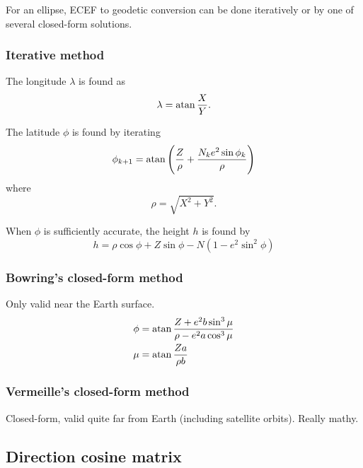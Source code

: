 For an ellipse, ECEF to geodetic conversion can be done iteratively or by one of several closed-form solutions.

\subsubsection{Iterative method}
The longitude $\lambda$ is found as
\begin{equation}
    \lambda = \operatorname{atan} \frac{X}{Y} .
\end{equation}

The latitude $\phi$ is found by iterating
\begin{equation}
    \phi_{k+1}
    =
    \operatorname{atan}
    \left(
        \frac{Z}{\rho}
        +
        \frac{N_k e^2 \sin \phi_k}{\rho}
    \right)
\end{equation}
where
\begin{equation}
    \rho = \sqrt{X^2 + Y^2} .
\end{equation}

When $\phi$ is sufficiently accurate, the height $h$ is found by
\begin{equation}
    h = \rho \cos \phi + Z \sin \phi - N(1 - e^2 \sin^2 \phi)
\end{equation}


\subsubsection{Bowring's closed-form method}
Only valid near the Earth surface.
\begin{equation}
\begin{split}
    \phi &= \operatorname{atan} \frac{Z + e^2 b \sin^3 \mu}{\rho - e^2 a \cos^3 \mu} \\
    \mu  &= \operatorname{atan} \frac{Z a}{\rho b}
\end{split}
\end{equation}

\subsubsection{Vermeille's closed-form method}
Closed-form, valid quite far from Earth (including satellite orbits). Really mathy.

\subsection{Direction cosine matrix}

